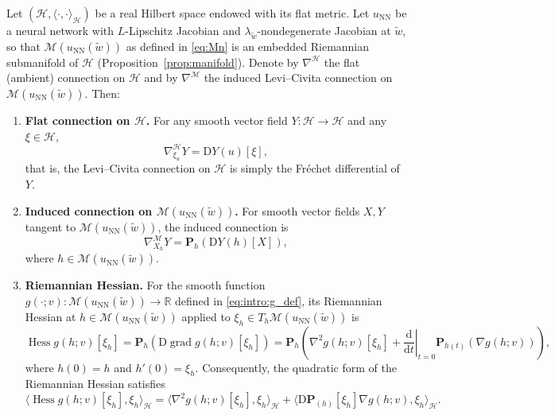 \documentclass[twoside,11pt]{article}
\newcommand{\R}{\mathbb{R}}
\renewcommand{\P}{\mathbf{P}}
\newcommand{\ud}{\mathrm{d}}
\newcommand{\Hess}{\operatorname{Hess} }
\newcommand{\grad}{\operatorname{grad} }
\newcommand{\NN}{\mathrm{NN}}
\begin{document}
\begin{lemma}\label{lem:connection}
Let $(\mathcal H,\langle\cdot,\cdot\rangle_{\mathcal H})$ be a real Hilbert space endowed with its flat metric. Let $u_\NN$ be a neural network with $L$-Lipschitz Jacobian and $\lambda_{\tilde w}$-nondegenerate Jacobian at $\tilde w$, so that $\mathcal{M}( u_\NN(\tilde w))$ as defined in \eqref{eq:Mn} is an embedded Riemannian submanifold of $\mathcal{H}$ (Proposition~\ref{prop:manifold}). Denote by $\nabla^{\mathcal H}$ the flat (ambient) connection on $\mathcal H$ and by $\nabla^{\mathcal M}$ the induced Levi--Civita connection on $\mathcal{M}( u_\NN(\tilde w))$. Then:
\begin{enumerate}
\item \textbf{Flat connection on $\mathcal H$.}
For any smooth vector field $Y:\mathcal H\to\mathcal H$ and any $\xi\in\mathcal H$,
\[
\nabla^{\mathcal H}_{\xi_{u}}Y = \mathrm D Y(u)[\xi],
\]
that is, the Levi--Civita connection on $\mathcal H$ is simply the Fr\'echet differential of~$Y$.

\item \textbf{Induced connection on $\mathcal{M}( u_\NN(\tilde w))$.}
For smooth vector fields $X,Y$ tangent to $\mathcal{M}( u_\NN(\tilde w))$, the induced connection is
\begin{equation}\label{eq:induced-connection}
\nabla^{\mathcal M}_{X_h} Y = \P_h (  \mathrm D Y(h)[X]),
\end{equation}
where $h\in \mathcal{M}( u_\NN(\tilde w))$.

\item \textbf{Riemannian Hessian.}
For the smooth function $g(\cdot;v):\mathcal{M}( u_\NN(\tilde w))\to\R$ defined in \eqref{eq:intro:g_def}, its Riemannian Hessian at $h \in \mathcal{M}( u_\NN(\tilde w))$ applied to $\xi_h \in T_h\mathcal{M}( u_\NN(\tilde w))$ is
\begin{equation}\label{eq:RiemHess}
\Hess g(h; v)[\xi_h]
 = \P_h \left(  \mathrm D \grad g(h; v)[\xi_h] \right)
 = \P_h\left(\nabla^2 g(h; v)[\xi_h] +\left.\frac{\ud}{\ud t}\right\vert_{t=0} \P_{h(t)} \left(\nabla g(h; v)\right)\right),
\end{equation}
where $h(0) = h$ and $h'(0) = \xi_h$.
Consequently, the quadratic form of the Riemannian Hessian satisfies
\begin{equation}\label{eq:RiemHessForm}
\langle \Hess g(h; v)[\xi_h],\xi_h\rangle_{\mathcal H}
 = \langle\nabla^2 g(h; v)[\xi_h],\xi_h\rangle_{\mathcal H}
   + \langle\mathrm D \P_{(h)}[\xi_h] \nabla g(h; v) , \xi_h \rangle_{\mathcal H}.
\end{equation}
\end{enumerate}
\end{lemma}
\end{document}
